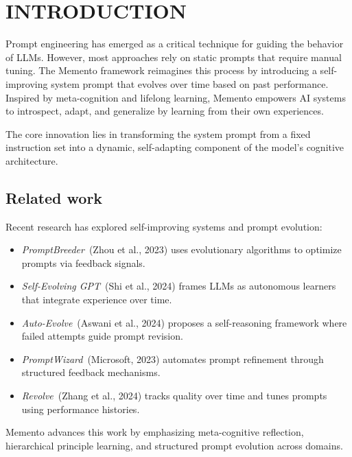 \documentclass[10pt,a4paper,twocolumn]{article}
\begin{document}


\section{INTRODUCTION}

Prompt engineering has emerged as a critical technique for guiding the behavior of LLMs. However, most approaches rely on static prompts that require manual tuning. The Memento framework reimagines this process by introducing a self-improving system prompt that evolves over time based on past performance. Inspired by meta-cognition and lifelong learning, Memento empowers AI systems to introspect, adapt, and generalize by learning from their own experiences.

The core innovation lies in transforming the system prompt from a fixed instruction set into a dynamic, self-adapting component of the model’s cognitive architecture.



\subsection{Related work}

Recent research has explored self-improving systems and prompt evolution:

\begin{itemize}
    \item \textit{PromptBreeder} (Zhou et al., 2023) uses evolutionary algorithms to optimize prompts via feedback signals.
    \item \textit{Self-Evolving GPT} (Shi et al., 2024) frames LLMs as autonomous learners that integrate experience over time.
    \item \textit{Auto-Evolve} (Aswani et al., 2024) proposes a self-reasoning framework where failed attempts guide prompt revision.
    \item \textit{PromptWizard} (Microsoft, 2023) automates prompt refinement through structured feedback mechanisms.
    \item \textit{Revolve} (Zhang et al., 2024) tracks quality over time and tunes prompts using performance histories.
\end{itemize}
Memento advances this work by emphasizing meta-cognitive reflection, hierarchical principle learning, and structured prompt evolution across domains.
\end{document}
